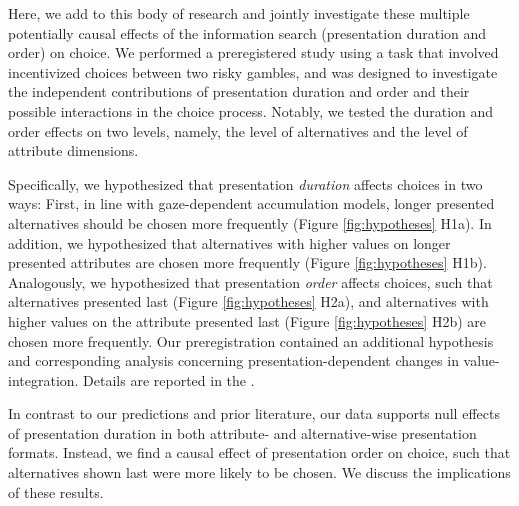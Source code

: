 \documentclass[11pt, a4paper, twocolumn, abstract]{scrartcl}
\begin{document}
Here, we add to this body of research and jointly investigate these multiple potentially causal effects of the information search (presentation duration and order) on choice. We performed a preregistered study using a task that involved incentivized choices between two risky gambles, and was designed to investigate the independent contributions of presentation duration and order and their possible interactions in the choice process. Notably, we tested the duration and order effects on two levels, namely, the level of alternatives and the level of attribute dimensions.

Specifically, we hypothesized that presentation \emph{duration} affects choices in two ways: First, in line with gaze-dependent accumulation models, longer presented alternatives should be chosen more frequently (Figure \ref{fig:hypotheses} H1a). In addition, we hypothesized that alternatives with higher values on longer presented attributes are chosen more frequently (Figure \ref{fig:hypotheses} H1b).
Analogously, we hypothesized that presentation \emph{order} affects choices, such that alternatives presented last (Figure \ref{fig:hypotheses} H2a), and alternatives with higher values on the attribute presented last (Figure \ref{fig:hypotheses} H2b) are chosen more frequently. Our preregistration contained an additional hypothesis and corresponding analysis concerning presentation-dependent changes in value-integration. Details are reported in the .

In contrast to our predictions and prior literature, our data supports null effects of presentation duration in both attribute- and alternative-wise presentation formats. Instead, we find a causal effect of presentation order on choice, such that alternatives shown last were more likely to be chosen. We discuss the implications of these results.
\end{document}
